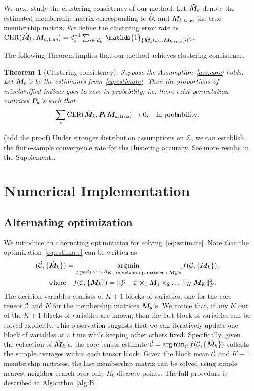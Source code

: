 \documentclass{article}
\newtheorem{theorem}{Theorem}
\begin{document}
We next study the clustering consistency of our method. Let $\hat {\bm M}_k$ denote the estimated membership matrix corresponding to $\hat\Theta$, and $\bm M_{k,\text{true}}$ the true membership matrix. We define the clustering error rate as $\text{CER}(\hat \mM_k, \trueM)=d_k^{-1}\sum_{i\in[d_k]}\mathds{1}_{\{\hat \mM_k(i)=\trueM(i)\}}$. 

The following Theorem implies that our method achieves clustering consistence. 
\begin{theorem}[Clustering consistency]\label{thm:partition}
Suppose the Assumption~\eqref{ass:core} holds. Let $\hat {\bm M}_k$'s be the estimators from~\eqref{eq:estimate}. Then the proportions of misclassified indices goes to zero in probability; i.e. there exist permutation matrices $\bm{P}_k$'s such that
\[
\sum_k \text{CER}(\hat {\bm M}_k, \bm{P}_k\bm M_{k,\text{true}}) \rightarrow 0, \quad \text{in probability}. 
\]
\end{theorem}
(add the proof)
Under stronger distribution assumptions on $\mathcal{E}$, we can establish the finite-sample convergence rate for the clustering accuracy. See more results in the Supplements. 

\section{Numerical Implementation}
\subsection{Alternating optimization}
We introduce an alternating optimization for solving~\eqref{eq:estimate}. Note that the optimization~\eqref{eq:estimate} can be written as
\begin{align}\label{eq:op}
(\hat {\mathcal{C}}, \{\hat {\bm M}_k\})&=\operatorname*{arg\,min}_{\mathcal{C}\in\mathbb{R}^{R_1\times \cdots \times R_K}, \text{ membership matrices $\bm M_k$'s}} f(\mathcal{C},\{\bm M_k\}),\notag\\
 \text{where}&\quad f(\mathcal{C},\{\bm M_k\})=\lVert\mathcal{Y}-\mathcal{C}\times_1\bm M_1\times_2\ldots\times_K\bm M_K\rVert_F^2.\notag
\end{align}
The decision variables consists of $K+1$ blocks of variables, one for the core tensor $\mathcal{C}$ and $K$ for the membership matrices $\bm M_k$'s. We notice that, if any $K$ out of the $K+1$ blocks of variables are known, then the last block of variables can be solved explicitly. This observation suggests that we can iteratively update one block of variables at a time while keeping other others fixed. Specifically, given the collection of $\hat {\bm M}_k$'s, the core tensor estimate $\hat {\mathcal{C}}=\operatorname*{arg\,min}_{\mathcal{C}}f(\mathcal{C},\{\hat {\bm M}_k\})$ collects the sample averages within each tensor block. Given the block mean $\hat {\mathcal{C}}$ and $K-1$ membership matrices, the last membership matrix can be solved using simple nearest neighbor search over only $R_k$ discrete points. The full procedure is described in Algorithm~\ref{alg:B}.
\end{document}
